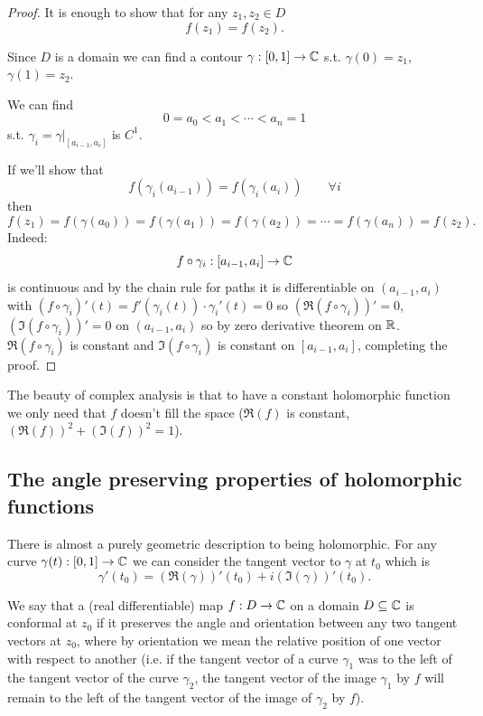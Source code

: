 \documentclass[10pt, a4paper]{article}
\begin{document}
\begin{theorem}[continues = companalyII:thm:zerodivthm]
    \begin{proof}
        It is enough to show that for any $z_1, z_2 \in D$
        \[
        f(z_1) = f(z_2).
        \]

        Since $D$ is a domain we can find a contour $\gamma : [0, 1] \to \mathbb{C}$ s.t. $\gamma(0) = z_1$,
        $\gamma(1) = z_2$.

        We can find
        \[
        0 = a_0 < a_1 < \dotsi < a_n = 1
        \]
        s.t. $\gamma_i = \gamma|_{[a_{i - 1}, a_i]}$ is $C ^ 1$.

        If we'll show that
        \[
        f(\gamma_i(a_{i - 1})) = f(\gamma_i(a_i))\qquad \forall i
        \]
        then
        \[
        f(z_1) = f(\gamma(a_0)) = f(\gamma(a_1)) = f(\gamma(a_2)) = \dotsi = f(\gamma(a_n)) = f(z_2).
        \]
        Indeed:
        \[
        f \circ \gamma_i : [a_{i - 1}, a_i] \to \mathbb{C}
        \]
        is continuous and by the chain rule for paths it is differentiable on $(a_{i - 1}, a_i)$ with $(f \circ \gamma_i)'(t) = f'(\gamma_i(t))\cdot\gamma_i'(t) = 0$ so $(\Re(f \circ \gamma_i))' = 0$,
        $(\Im(f\circ\gamma_i))' = 0$ on $(a_{i - 1}, a_i)$ so by zero derivative theorem on $\mathbb{R}$.
        $\Re(f\circ \gamma_i)$ is constant and $\Im(f \circ \gamma_i)$ is constant on $[a_{i - 1}, a_i]$,
        completing the proof.
    \end{proof}
\end{theorem}

The beauty of complex analysis is that to have a constant holomorphic function we only need that $f$ doesn't fill the space
($\Re(f)$ is constant,
$(\Re(f)) ^ 2 + (\Im(f)) ^ 2 = 1$).

\subsection{The angle preserving properties of holomorphic functions}
There is almost a purely geometric description to being holomorphic.
For any curve $\gamma(t) : [0, 1] \to \mathbb{C}$ we can consider the tangent vector to $\gamma$ at $t_0$ which is
\[
\gamma'(t_0) = (\Re(\gamma))'(t_0) + i(\Im(\gamma))'(t_0).
\]

\begin{definition}
    We say that a
    (real differentiable)
    map $f : D \to \mathbb{C}$ on a domain $D \subseteq \mathbb{C}$ is conformal at $z_0$ if it preserves the angle and orientation between any two tangent vectors at $z_0$,
    where by orientation we mean the relative position of one vector with respect to another
    (i.e. if the tangent vector of a curve $\gamma_1$ was to the left of the tangent vector of the curve $\gamma_2$,
    the tangent vector of the image $\gamma_1$ by $f$ will remain to the left of the tangent vector of the image of $\gamma_2$ by $f$).
\end{definition}
\end{document}
